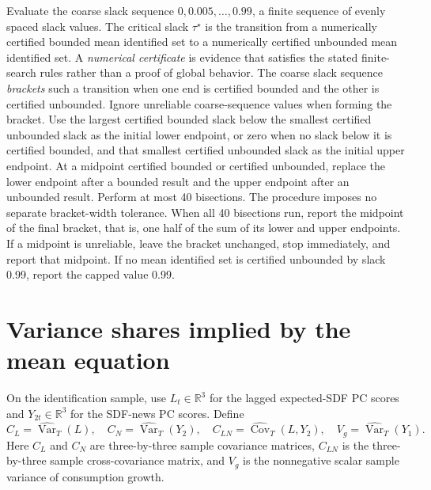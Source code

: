 \documentclass[11pt]{article}
\begin{document}
Evaluate the coarse slack sequence \(0,0.005,\ldots,0.99\), a finite sequence of evenly spaced slack
values. The critical slack \(\tau^\star\) is the
transition from a numerically certified bounded mean identified set to a numerically certified unbounded mean identified set. A
\emph{numerical certificate} is evidence that satisfies the stated finite-search rules rather than a
proof of global behavior. The coarse slack sequence \emph{brackets} such a transition when one end is
certified bounded and the other is certified unbounded. Ignore unreliable coarse-sequence values when
forming the bracket. Use the largest certified bounded slack below the smallest certified unbounded slack as the initial
lower endpoint, or zero when no slack below it is certified bounded, and that smallest certified
unbounded slack as the initial upper endpoint. At a midpoint certified bounded or certified unbounded, replace the lower endpoint after a
bounded result and the upper endpoint after an unbounded result. Perform at most 40 bisections. The
procedure imposes no separate bracket-width tolerance. When all 40 bisections run, report the
midpoint of the final bracket, that is, one half of the sum of its lower and upper endpoints. If a midpoint is unreliable, leave the
bracket unchanged, stop immediately, and report that midpoint.
If no mean identified set is certified unbounded by slack 0.99, report the capped value 0.99.

\section{Variance shares implied by the mean equation}
\label{sec:shares}

On the identification sample, use \(L_t\in\mathbb R^3\) for the lagged expected-SDF PC scores and
\(Y_{2t}\in\mathbb R^3\) for the SDF-news PC scores. Define
\begin{equation*}
 C_L=\widehat{\operatorname{Var}}_T(L),\quad
 C_N=\widehat{\operatorname{Var}}_T(Y_2),\quad
 C_{LN}=\widehat{\operatorname{Cov}}_T(L,Y_2),\quad
 V_g=\widehat{\operatorname{Var}}_T(Y_1).
\end{equation*}
Here \(C_L\) and \(C_N\) are three-by-three sample covariance matrices,
\(C_{LN}\) is the three-by-three sample cross-covariance matrix, and \(V_g\) is the nonnegative
scalar sample variance of consumption growth.
\end{document}
